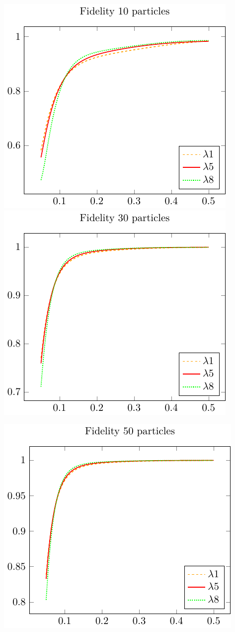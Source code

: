 \includegraphics{./gfx/fidelity_compare10.pdf}
\includegraphics{./gfx/fidelity_compare30.pdf}

\centering
\includegraphics{./gfx/fidelity_compare50.pdf}
